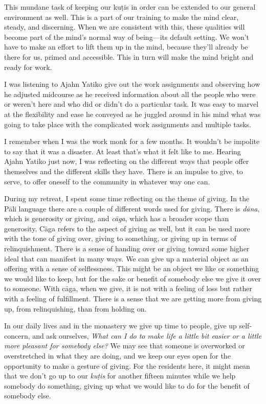 This mundane task of keeping our kuṭis in order can be extended to 
our general environment as well. This is a part of our training to make 
the mind clear, steady, and discerning. When we are consistent with 
this, these qualities will become part of the mind's normal way of 
being---its default setting. We won't have to make an effort to lift 
them up in the mind, because they'll already be there for us, primed 
and accessible. This in turn will make the mind bright and ready for 
work.


I was listening to Ajahn Yatiko give out the work assignments and 
observing how he adjusted midcourse as he received information about 
all the people who were or weren't here and who did or didn't do a 
particular task. It was easy to marvel at the flexibility and ease he 
conveyed as he juggled around in his mind what was going to take place 
with the complicated work assignments and multiple tasks.

I remember when I was the work monk for a few months. It wouldn't be 
impolite to say that it was a disaster. At least that's what it felt 
like to me. Hearing Ajahn Yatiko just now, I was reflecting on the 
different ways that people offer themselves and the different skills 
they have. There is an impulse to give, to serve, to offer oneself to 
the community in whatever way one can.

During my retreat, I spent some time reflecting on the theme of giving. 
In the Pāli language there are a couple of different words used for 
giving. There is \emph{dāna}, which is generosity or giving, and 
\emph{cāga}, which has a broader scope than generosity. Cāga refers 
to the aspect of giving as well, but it can be used more with the tone 
of giving over, giving to something, or giving up in terms of 
relinquishment. There is a sense of handing over or giving toward some 
higher ideal that can manifest in many ways. We can give up a material 
object as an offering with a sense of selflessness. This might be an 
object we like or something we would like to keep, but for the sake or 
benefit of somebody else we give it over to someone. With cāga, when 
we give, it is not with a feeling of loss but rather with a feeling of 
fulfillment. There is a sense that we are getting more from giving up, 
from relinquishing, than from holding on.

In our daily lives and in the monastery we give up time to people, give 
up self-concern, and ask ourselves, \emph{What can I do to make life a 
little bit easier or a little more pleasant for somebody else?} We may 
see that someone is overworked or overstretched in what they are doing, 
and we keep our eyes open for the opportunity to make a gesture of 
giving. For the residents here, it might mean that we don't go up to 
our \emph{kuṭis} for another fifteen minutes while we help somebody 
do something, giving up what we would like to do for the benefit of 
somebody else.

